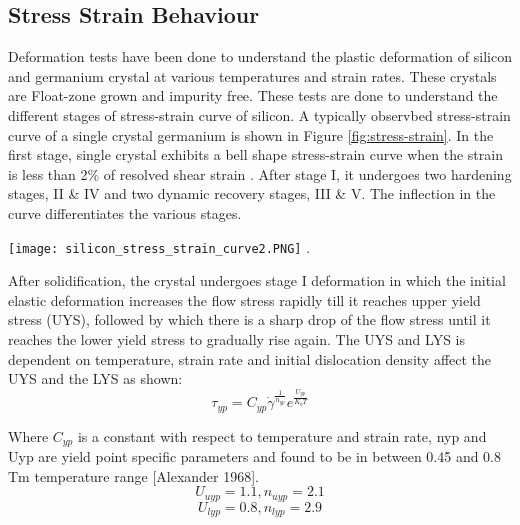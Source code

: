 \subsection{Stress Strain Behaviour}
Deformation tests have been done \cite{patel1963macroscopic,alexander1969dislocations} to understand the plastic deformation of silicon and germanium crystal at various temperatures and strain rates. These crystals are Float-zone grown and impurity free. These tests are done to understand the different stages of stress-strain curve of silicon. A typically observbed stress-strain curve of a single crystal germanium is shown in Figure \ref{fig:stress-strain}. In the first stage, single crystal exhibits a bell shape stress-strain curve when the strain is less than 2\% of resolved shear strain \cite{patel1963macroscopic}. After stage I, it undergoes two hardening stages, II \& IV and two dynamic recovery stages, III \& V. The inflection in the curve differentiates the various stages.
\noindent
\begin{minipage}[c]{\textwidth}
\centering
       \texttt{[image: silicon\_stress\_strain\_curve2.PNG]}
      .
        \label{fig:stress-strain}
\end{minipage}

After solidification, the crystal undergoes stage I deformation in which the initial elastic deformation increases the flow stress rapidly till it reaches upper yield stress (UYS), followed by which there is a sharp drop of the flow stress until it reaches the lower yield stress to gradually rise again. The UYS and LYS is dependent on temperature, strain rate and initial dislocation density affect the UYS and the LYS \cite{alexander1969dislocations, yonenaga1978dislocation} as shown:
\begin{equation}
   \tau_{yp} = C_{yp} \dot{\gamma}^{\frac{1}{n_{yp}}} e^{\frac{U_{yp}}{K_{b}T}}
   \label{yield_change}
\end{equation}

Where $C_{yp}$ is a constant with respect to temperature and strain rate, nyp and Uyp are yield point specific parameters and found to be in between 0.45 and 0.8 Tm temperature range [Alexander 1968].
\[U_{uyp} = 1.1, n_{uyp} = 2.1\]
\[U_{lyp} = 0.8, n_{lyp} = 2.9\] 

